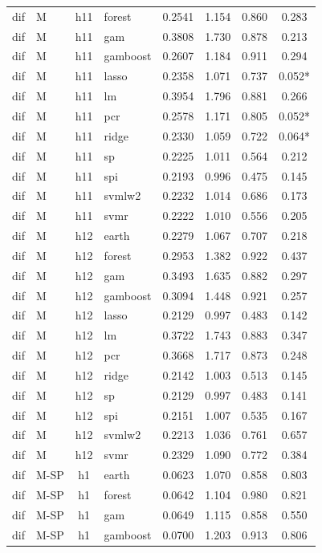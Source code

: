 \begin{ThreePartTable}
\begin{longtable}[t]{llclcccc}
dif & M & h11 & forest & 0.2541 & 1.154 & 0.860 & 0.283\\
dif & M & h11 & gam & 0.3808 & 1.730 & 0.878 & 0.213\\
dif & M & h11 & gamboost & 0.2607 & 1.184 & 0.911 & 0.294\\
dif & M & h11 & lasso & 0.2358 & 1.071 & 0.737 & 0.052*\\
dif & M & h11 & lm & 0.3954 & 1.796 & 0.881 & 0.266\\
dif & M & h11 & pcr & 0.2578 & 1.171 & 0.805 & 0.052*\\
dif & M & h11 & ridge & 0.2330 & 1.059 & 0.722 & 0.064*\\
dif & M & h11 & sp & 0.2225 & 1.011 & 0.564 & 0.212\\
dif & M & h11 & spi & 0.2193 & 0.996 & 0.475 & 0.145\\
dif & M & h11 & svmlw2 & 0.2232 & 1.014 & 0.686 & 0.173\\
dif & M & h11 & svmr & 0.2222 & 1.010 & 0.556 & 0.205\\
\addlinespace
dif & M & h12 & earth & 0.2279 & 1.067 & 0.707 & 0.218\\
dif & M & h12 & forest & 0.2953 & 1.382 & 0.922 & 0.437\\
dif & M & h12 & gam & 0.3493 & 1.635 & 0.882 & 0.297\\
dif & M & h12 & gamboost & 0.3094 & 1.448 & 0.921 & 0.257\\
dif & M & h12 & lasso & 0.2129 & 0.997 & 0.483 & 0.142\\
dif & M & h12 & lm & 0.3722 & 1.743 & 0.883 & 0.347\\
dif & M & h12 & pcr & 0.3668 & 1.717 & 0.873 & 0.248\\
dif & M & h12 & ridge & 0.2142 & 1.003 & 0.513 & 0.145\\
dif & M & h12 & sp & 0.2129 & 0.997 & 0.483 & 0.141\\
dif & M & h12 & spi & 0.2151 & 1.007 & 0.535 & 0.167\\
dif & M & h12 & svmlw2 & 0.2213 & 1.036 & 0.761 & 0.657\\
dif & M & h12 & svmr & 0.2329 & 1.090 & 0.772 & 0.384\\
\addlinespace
dif & M-SP & h1 & earth & 0.0623 & 1.070 & 0.858 & 0.803\\
dif & M-SP & h1 & forest & 0.0642 & 1.104 & 0.980 & 0.821\\
dif & M-SP & h1 & gam & 0.0649 & 1.115 & 0.858 & 0.550\\
dif & M-SP & h1 & gamboost & 0.0700 & 1.203 & 0.913 & 0.806\\

\end{longtable}
\end{ThreePartTable}
